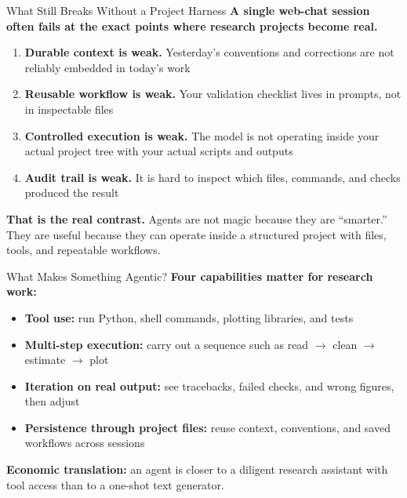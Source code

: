 \documentclass[10pt,english,aspectratio=169]{beamer}
\begin{document}
\begin{frame}{What Still Breaks Without a Project Harness}
\textbf{A single web-chat session often fails at the exact points where research projects become real.}

\vspace{0.25cm}

\begin{enumerate}
    \item \textbf{Durable context is weak.} Yesterday's conventions and corrections are not reliably embedded in today's work
    \item \textbf{Reusable workflow is weak.} Your validation checklist lives in prompts, not in inspectable files
    \item \textbf{Controlled execution is weak.} The model is not operating inside your actual project tree with your actual scripts and outputs
    \item \textbf{Audit trail is weak.} It is hard to inspect which files, commands, and checks produced the result
\end{enumerate}

\vspace{0.3cm}

\textbf{That is the real contrast.} Agents are not magic because they are ``smarter.'' They are useful because they can operate inside a structured project with files, tools, and repeatable workflows.
\end{frame}

\begin{frame}{What Makes Something Agentic?}
\textbf{Four capabilities matter for research work:}

\vspace{0.25cm}

\begin{itemize}
    \item \textbf{Tool use:} run Python, shell commands, plotting libraries, and tests
    \item \textbf{Multi-step execution:} carry out a sequence such as read $\to$ clean $\to$ estimate $\to$ plot
    \item \textbf{Iteration on real output:} see tracebacks, failed checks, and wrong figures, then adjust
    \item \textbf{Persistence through project files:} reuse context, conventions, and saved workflows across sessions
\end{itemize}

\vspace{0.3cm}

\textbf{Economic translation:} an agent is closer to a diligent research assistant with tool access than to a one-shot text generator.
\end{frame}
\end{document}
